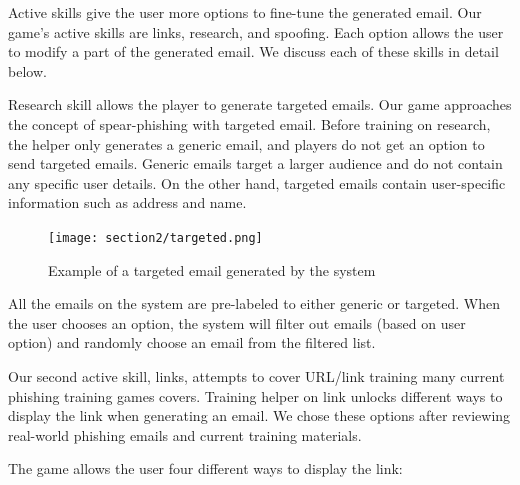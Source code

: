 Active skills give the user more options to fine-tune the generated email. Our game's active skills are links, research, and spoofing. Each option allows the user to modify a part of the generated email. We discuss each of these skills in detail below.

Research skill allows the player to generate targeted emails. Our game approaches the concept of spear-phishing with targeted email. Before training on research, the helper only generates a generic email, and players do not get an option to send targeted emails. Generic emails target a larger audience and do not contain any specific user details. On the other hand, targeted emails contain user-specific information such as address and name.

\begin{figure}[ht]
    \centering
    \texttt{[image: section2/targeted.png]}
    \caption{Example of a targeted email generated by the system}
\end{figure}

All the emails on the system are pre-labeled to either generic or targeted. When the user chooses an option, the system will filter out emails (based on user option) and randomly choose an email from the filtered list.

Our second active skill, links, attempts to cover URL/link training many current phishing training games covers. Training helper on link unlocks different ways to display the link when generating an email. We chose these options after reviewing real-world phishing emails and current training materials.

The game allows the user four different ways to display the link:

